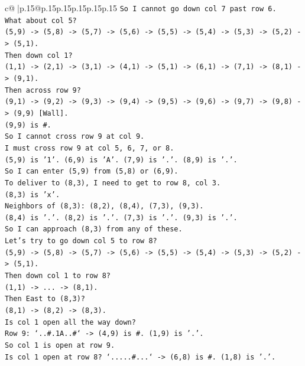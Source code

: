 \documentclass{article}
\begin{document}
{\begin{supertabular}{c@{$\;$}|p{.15\linewidth}@{}p{.15\linewidth}p{.15\linewidth}p{.15\linewidth}p{.15\linewidth}p{.15\linewidth}}
{{{\texttt{So I cannot go down col 7 past row 6.} \\
\texttt{What about col 5?} \\
\texttt{(5,9) {-}> (5,8) {-}> (5,7) {-}> (5,6) {-}> (5,5) {-}> (5,4) {-}> (5,3) {-}> (5,2) {-}> (5,1).} \\
\texttt{Then down col 1?} \\
\texttt{(1,1) {-}> (2,1) {-}> (3,1) {-}> (4,1) {-}> (5,1) {-}> (6,1) {-}> (7,1) {-}> (8,1) {-}> (9,1).} \\
\texttt{Then across row 9?} \\
\texttt{(9,1) {-}> (9,2) {-}> (9,3) {-}> (9,4) {-}> (9,5) {-}> (9,6) {-}> (9,7) {-}> (9,8) {-}> (9,9) {[}Wall{]}.} \\
\texttt{(9,9) is \#.} \\
\texttt{So I cannot cross row 9 at col 9.} \\
\texttt{I must cross row 9 at col 5, 6, 7, or 8.} \\
\texttt{(5,9) is '1'. (6,9) is 'A'. (7,9) is '.'. (8,9) is '.'.} \\
\texttt{So I can enter (5,9) from (5,8) or (6,9).} \\
\texttt{To deliver to (8,3), I need to get to row 8, col 3.} \\
\texttt{(8,3) is 'x'.} \\
\texttt{Neighbors of (8,3): (8,2), (8,4), (7,3), (9,3).} \\
\texttt{(8,4) is '.'. (8,2) is '.'. (7,3) is '.'. (9,3) is '.'.} \\
\texttt{So I can approach (8,3) from any of these.} \\
\texttt{Let's try to go down col 5 to row 8?} \\
\texttt{(5,9) {-}> (5,8) {-}> (5,7) {-}> (5,6) {-}> (5,5) {-}> (5,4) {-}> (5,3) {-}> (5,2) {-}> (5,1).} \\
\texttt{Then down col 1 to row 8?} \\
\texttt{(1,1) {-}> ... {-}> (8,1).} \\
\texttt{Then East to (8,3)?} \\
\texttt{(8,1) {-}> (8,2) {-}> (8,3).} \\
\texttt{Is col 1 open all the way down?} \\
\texttt{Row 9: `..\#.1A..\#` {-}> (4,9) is \#. (1,9) is '.'.} \\
\texttt{So col 1 is open at row 9.} \\
\texttt{Is col 1 open at row 8? `.....\#...` {-}> (6,8) is \#. (1,8) is '.'.} \\
}}}
\end{supertabular}}
\end{document}

